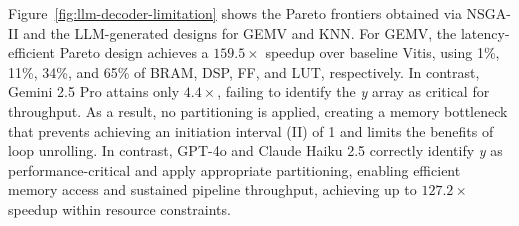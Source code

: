 Figure~\ref{fig:llm-decoder-limitation} shows the Pareto frontiers obtained via NSGA-II and the LLM-generated designs for GEMV and KNN.
For GEMV, the latency-efficient Pareto design achieves a $159.5\times$ speedup over baseline Vitis, using 1\%, 11\%, 34\%, and 65\% of BRAM, DSP, FF, and LUT, respectively. 
In contrast, Gemini 2.5 Pro attains only $4.4\times$, failing to identify the \textit{y} array as critical for throughput. 
As a result, no partitioning is applied, creating a memory bottleneck that prevents achieving an initiation interval (II) of 1 and limits the benefits of loop unrolling.
In contrast, GPT-4o and Claude Haiku 2.5 correctly identify \textit{y} as performance-critical and apply appropriate partitioning, enabling efficient memory access and sustained pipeline throughput, achieving up to $127.2\times$ speedup within resource constraints.

